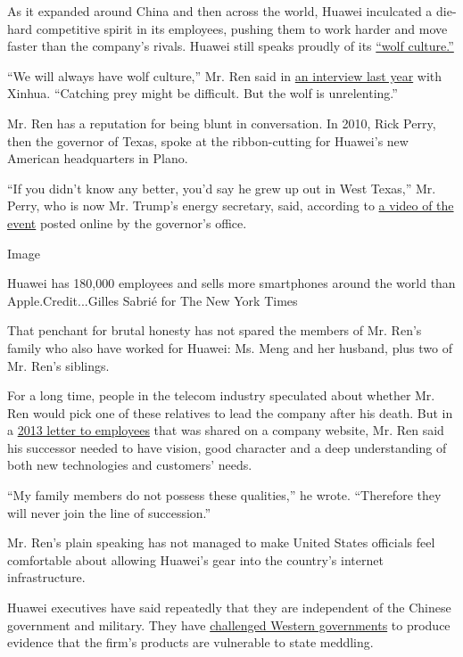 As it expanded around China and then across the world, Huawei inculcated
a die-hard competitive spirit in its employees, pushing them to work
harder and move faster than the company's rivals. Huawei still speaks
proudly of its
\href{https://www.nytimes.com/2018/12/18/technology/huawei-workers-iran-sanctions.html}{``wolf
culture.''}

``We will always have wolf culture,'' Mr. Ren said in
\href{http://www.xinhuanet.com/fortune/2018-04/05/c_1122642170.htm}{an
interview last year} with Xinhua. ``Catching prey might be difficult.
But the wolf is unrelenting.''

Mr. Ren has a reputation for being blunt in conversation. In 2010, Rick
Perry, then the governor of Texas, spoke at the ribbon-cutting for
Huawei's new American headquarters in Plano.

``If you didn't know any better, you'd say he grew up out in West
Texas,'' Mr. Perry, who is now Mr. Trump's energy secretary, said,
according to \href{https://www.youtube.com/watch?v=0eruWGDSYDg}{a video
of the event} posted online by the governor's office.

Image

Huawei has 180,000 employees and sells more smartphones around the world
than Apple.Credit...Gilles Sabrié for The New York Times

That penchant for brutal honesty has not spared the members of Mr. Ren's
family who also have worked for Huawei: Ms. Meng and her husband, plus
two of Mr. Ren's siblings.

For a long time, people in the telecom industry speculated about whether
Mr. Ren would pick one of these relatives to lead the company after his
death. But in a
\href{http://xinsheng.huawei.com/cn/index.php?app=forum\&mod=Detail\&act=index\&id=1353901}{2013
letter to employees} that was shared on a company website, Mr. Ren said
his successor needed to have vision, good character and a deep
understanding of both new technologies and customers' needs.

``My family members do not possess these qualities,'' he wrote.
``Therefore they will never join the line of succession.''

Mr. Ren's plain speaking has not managed to make United States officials
feel comfortable about allowing Huawei's gear into the country's
internet infrastructure.

Huawei executives have said repeatedly that they are independent of the
Chinese government and military. They have
\href{https://www.nytimes.com/2018/12/21/technology/the-week-in-tech-hostages-in-the-us-and-china-tech-cold-war.html}{challenged
Western governments} to produce evidence that the firm's products are
vulnerable to state meddling.

